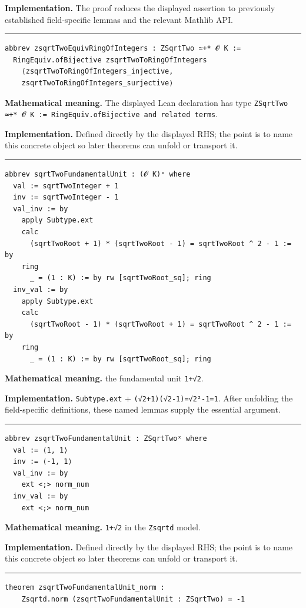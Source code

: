 \documentclass[UTF8,a4paper,11pt,fontset=fandol]{ctexart}
\theoremstyle{definition}
\newcommand{\statementsep}{\par\medskip\hrule\medskip}
\begin{document}
\noindent\textbf{Implementation.} The proof reduces the displayed assertion to previously established field-specific lemmas and the relevant Mathlib API.\par
\statementsep
\begin{verbatim}
abbrev zsqrtTwoEquivRingOfIntegers : ZSqrtTwo ≃+* 𝓞 K :=
  RingEquiv.ofBijective zsqrtTwoToRingOfIntegers
    ⟨zsqrtTwoToRingOfIntegers_injective,
    zsqrtTwoToRingOfIntegers_surjective⟩
\end{verbatim}
\noindent\textbf{Mathematical meaning.} The displayed Lean declaration has type \texttt{ZSqrtTwo ≃+* 𝓞 K := RingEquiv.\allowbreak{}ofBijective and related terms}.\par
\noindent\textbf{Implementation.} Defined directly by the displayed RHS; the point is to name this concrete object so later theorems can unfold or transport it.\par
\statementsep
\begin{verbatim}
abbrev sqrtTwoFundamentalUnit : (𝓞 K)ˣ where
  val := sqrtTwoInteger + 1
  inv := sqrtTwoInteger - 1
  val_inv := by
    apply Subtype.ext
    calc
      (sqrtTwoRoot + 1) * (sqrtTwoRoot - 1) = sqrtTwoRoot ^ 2 - 1 := by
    ring
      _ = (1 : K) := by rw [sqrtTwoRoot_sq]; ring
  inv_val := by
    apply Subtype.ext
    calc
      (sqrtTwoRoot - 1) * (sqrtTwoRoot + 1) = sqrtTwoRoot ^ 2 - 1 := by
    ring
      _ = (1 : K) := by rw [sqrtTwoRoot_sq]; ring
\end{verbatim}
\noindent\textbf{Mathematical meaning.} the fundamental unit \texttt{1+√2}.\par
\noindent\textbf{Implementation.} \texttt{Subtype.\allowbreak{}ext} + \texttt{(√2+1)(√2-1)=√2²-1=1}. After unfolding the field-specific definitions, these named lemmas supply the essential argument.\par
\statementsep
\begin{verbatim}
abbrev zsqrtTwoFundamentalUnit : ZSqrtTwoˣ where
  val := ⟨1, 1⟩
  inv := ⟨-1, 1⟩
  val_inv := by
    ext <;> norm_num
  inv_val := by
    ext <;> norm_num
\end{verbatim}
\noindent\textbf{Mathematical meaning.} \texttt{1+√2} in the \texttt{Zsqrtd} model.\par
\noindent\textbf{Implementation.} Defined directly by the displayed RHS; the point is to name this concrete object so later theorems can unfold or transport it.\par
\statementsep
\begin{verbatim}
theorem zsqrtTwoFundamentalUnit_norm :
    Zsqrtd.norm (zsqrtTwoFundamentalUnit : ZSqrtTwo) = -1
\end{verbatim}
\end{document}
